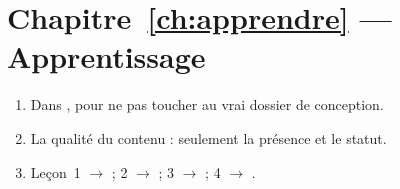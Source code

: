 \section*{Chapitre~\ref{ch:apprendre} --- Apprentissage}
\begin{enumerate}[label=\sffamily\bfseries\color{leaf}Q\arabic*.,leftmargin=2.2em]
  \item Dans , pour ne pas toucher au vrai dossier de conception.
  \item La qualité du contenu : seulement la présence et le statut.
  \item Leçon~1 $\to$  ; 2 $\to$  ; 3 $\to$  ; 4 $\to$ .
\end{enumerate}

